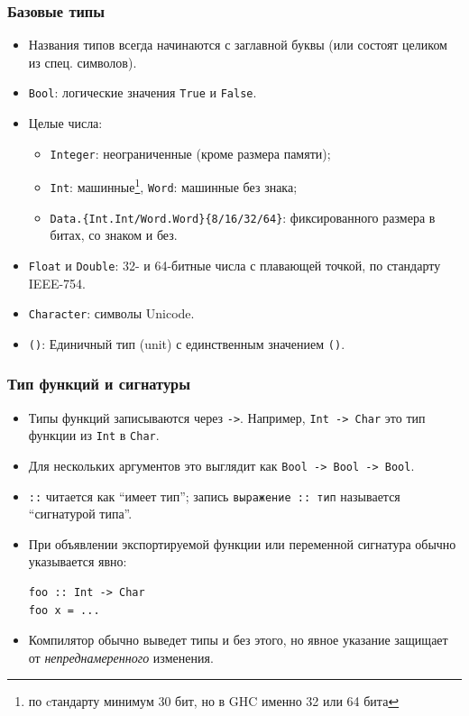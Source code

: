 \documentclass[11pt]{beamer}
\begin{document}
\begin{frame}[fragile]
\frametitle{Базовые типы}
\begin{itemize}
    \item Названия типов всегда начинаются с заглавной буквы (или состоят целиком из спец. символов).
    \item \lstinline|Bool|: логические значения \lstinline|True| и \lstinline|False|.
    \item Целые числа:
    \begin{itemize}
        \item \footnotesize \lstinline|Integer|: неограниченные (кроме размера памяти);
        \item \footnotesize \lstinline|Int|: машинные\footnote{по cтандарту минимум 30 бит, но в GHC именно 32 или 64 бита}, \lstinline|Word|: машинные без знака;
        \item \footnotesize \lstinline|Data.{Int.Int/Word.Word}{8/16/32/64}|: фиксированного размера в битах, со знаком и без.
    \end{itemize}
    \item \lstinline|Float| и \lstinline|Double|: 32- и 64-битные числа с плавающей точкой, по стандарту IEEE-754.
    \item \lstinline|Character|: символы Unicode.
    \item \lstinline|()|: Единичный тип (unit) с единственным значением \lstinline|()|.
\end{itemize}
\end{frame}

\begin{frame}[fragile]
\frametitle{Тип функций и сигнатуры}
\begin{itemize}
    \item Типы функций записываются через \lstinline|->|. Например, \lstinline|Int -> Char| это тип функции из \lstinline|Int| в \lstinline|Char|.
    
    \item Для нескольких аргументов это выглядит как \pause\lstinline|Bool -> Bool -> Bool|.
    
    \item \lstinline|::| читается как \enquote{имеет тип}; запись \lstinline|выражение :: тип| называется \enquote{сигнатурой типа}.
    
    \item При объявлении экспортируемой функции или переменной  сигнатура обычно указывается явно:
\begin{lstlisting}
foo :: Int -> Char
foo x = ...
\end{lstlisting}
    \item Компилятор обычно выведет типы и без этого, но явное указание защищает от \emph{непреднамеренного} изменения.
\end{itemize}
\end{frame}
\end{document}
